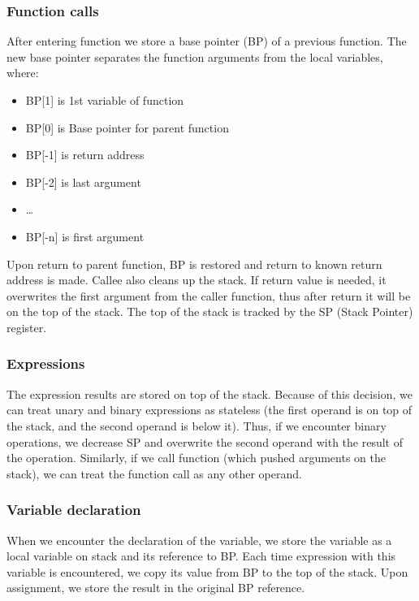 \documentclass[a4paper,11pt]{article}
\begin{document}
                \subsubsection{Function calls}
                    After entering function we store a base pointer (BP) of a previous function.
                    The new base pointer separates the function arguments from the local variables, where:
                    \begin{itemize}
                        \item BP[1] is 1st variable of function
                        \item BP[0] is Base pointer for parent function
                        \item BP[-1] is return address
                        \item BP[-2] is last argument
                        \item \ldots
                        \item BP[-n] is first argument
                    \end{itemize}
                    Upon return to parent function, BP is restored and return to known return address is made.
                    Callee also cleans up the stack.
                    If return value is needed, it overwrites the first argument from the caller function, thus after return it will be on the top of the stack.
                    The top of the stack is tracked by the SP (Stack Pointer) register.

                \subsubsection{Expressions}
                    The expression results are stored on top of the stack.
                    Because of this decision, we can treat unary and binary expressions as stateless (the first operand is on top of the stack, and the second operand is below it).
                    Thus, if we encounter binary operations, we decrease SP and overwrite the second operand with the result of the operation.
                    Similarly, if we call function (which pushed arguments on the stack), we can treat the function call as any other operand.


                \subsubsection{Variable declaration}
                    When we encounter the declaration of the variable, we store the variable as a local variable on stack and its reference to BP.
                    Each time expression with this variable is encountered, we copy its value from BP to the top of the stack.
                    Upon assignment, we store the result in the original BP reference.
\end{document}
